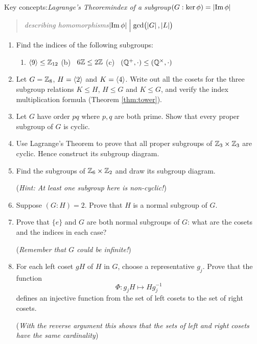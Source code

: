 \begin{exercises}
	Key concepts:\quad \emph{Lagrange's Theorem\qquad index of a subgroup\qquad $(G:\ker\phi)=\left| \operatorname{Im}\phi\right|$}
	\begin{quote}
		\emph{describing homomorphisms\qquad $\left| \operatorname{Im}\phi\right|\Bigm|\gcd\bigl(\left| G\right|,\left| L\right|\bigr)$}
	\end{quote}

	
	\begin{enumerate}
	  \item Find the indices of the following subgroups:
		\begin{enumerate}
	  	\item $\left\langle 9\right\rangle\le\mathbb{Z}_{12}$\qquad\qquad
	  	(b) \ $6\mathbb{Z}\le 2\mathbb{Z}$\qquad\qquad
	  	(c) \ $(\mathbb{Q}^+,\cdot)\le(\mathbb{Q}^\times,\cdot)$
		\end{enumerate}


		\item Let $G=\mathbb{Z}_8$, $H=\left\langle 2\right\rangle$ and $K=\left\langle 4\right\rangle$. Write out all the cosets for the three subgroup relations $K\le H$, $H\le G$ and $K\le G$, and verify the index multiplication formula (Theorem \ref{thm:tower}).
	  
	  
		\item Let $G$ have order $pq$ where $p,q$ are both prime. Show that every proper subgroup of $G$ is cyclic.
		
		
		\item Use Lagrange's Theorem to prove that all proper subgroups of $\mathbb{Z}_3\times\mathbb{Z}_3$ are cyclic. Hence construct its subgroup diagram.
		
		
		\item Find the subgroups of $\mathbb{Z}_6\times\mathbb{Z}_2$ and draw its subgroup diagram.\par
		(\emph{Hint: At least one subgroup here is \emph{non-cyclic}!})
		
		
		\item Suppose $(G:H)=2$. Prove that $H$ is a normal subgroup of $G$.
		
	  
	  \item Prove that $\{e\}$ and $G$ are both normal subgroups of $G$: what are the cosets and the indices in each case?\par
	  (\emph{Remember that $G$ could be infinite!})
	  
	  
	  \item\label{exs:indexcard} For each left coset $gH$ of $H$ in $G$, choose a representative $g_j$. Prove that the function
	  \[
	  	\Phi:g_jH\mapsto Hg_j^{-1}
	  \]
	  defines an injective function from the set of left cosets to the set of right cosets.\par
	  (\emph{With the reverse argument this shows that the sets of left and right cosets have the same cardinality})
		

\end{enumerate}
\end{exercises}
